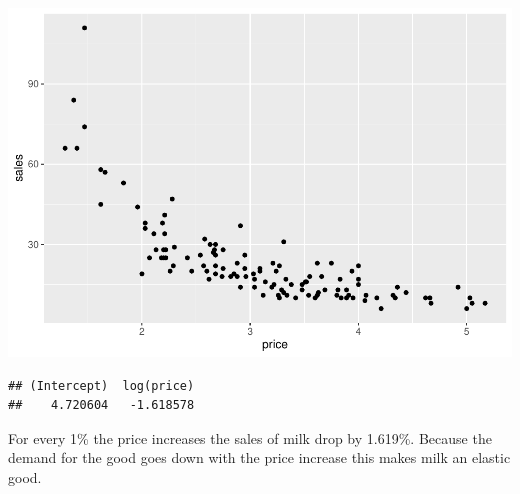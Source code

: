 \documentclass[
]{article}
\begin{document}
\includegraphics{HW3_files/figure-latex/unnamed-chunk-9-1.pdf}

\begin{verbatim}
## (Intercept)  log(price) 
##    4.720604   -1.618578
\end{verbatim}

For every 1\% the price increases the sales of milk drop by 1.619\%.
Because the demand for the good goes down with the price increase this
makes milk an elastic good.
\end{document}
